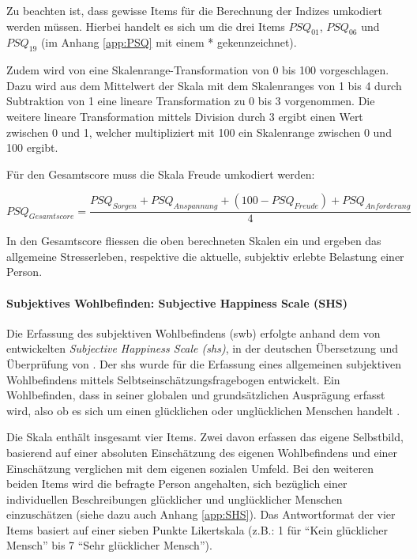 Zu beachten ist, dass gewisse Items für die Berechnung der Indizes umkodiert werden müssen. Hierbei handelt es sich um die drei Items $PSQ_{01}$, $PSQ_{06}$ und $PSQ_{19}$ (im Anhang \ref{app:PSQ} mit einem * gekennzeichnet).

Zudem wird von  eine Skalenrange-Transformation von 0 bis 100 vorgeschlagen. Dazu wird aus dem Mittelwert der Skala mit dem Skalenranges von 1 bis 4 durch Subtraktion von 1 eine lineare Transformation zu 0 bis 3 vorgenommen. Die weitere lineare Transformation mittels Division durch 3 ergibt einen Wert zwischen 0 und 1, welcher multipliziert mit 100 ein Skalenrange zwischen 0 und 100 ergibt.  

Für den Gesamtscore muss die Skala Freude umkodiert werden:

\begin{equation}\label{eq:PSQGesamtscore}
    PSQ_{Gesamtscore}=\frac{PSQ_{Sorgen}+PSQ_{Anspannung}+ (100-PSQ_{Freude})+PSQ_{Anforderung}}{4}
\end{equation}

In den Gesamtscore fliessen die oben berechneten Skalen ein und ergeben das allgemeine Stresserleben, respektive die aktuelle, subjektiv erlebte Belastung einer Person.

\paragraph{Subjektives Wohlbefinden: Subjective Happiness Scale (SHS)}\label{sec:SWB}
Die Erfassung des subjektiven Wohlbefindens (\acrshort{swb}) erfolgte anhand dem von  entwickelten \textit{Subjective Happiness Scale (\acrshort{shs})}, in der deutschen Übersetzung und Überprüfung von . Der \acrshort{shs} wurde für die Erfassung  eines allgemeinen subjektiven Wohlbefindens mittels Selbtseinschätzungsfragebogen entwickelt. Ein Wohlbefinden, dass in seiner globalen und grundsätzlichen Ausprägung erfasst wird, also ob es sich um einen glücklichen oder unglücklichen Menschen handelt  \cite[S.~139ff]{Lyubomirsky1999}.

Die Skala enthält insgesamt vier Items. Zwei davon erfassen das eigene Selbstbild, basierend auf einer absoluten Einschätzung des eigenen Wohlbefindens und einer Einschätzung verglichen mit dem eigenen sozialen Umfeld. Bei den weiteren beiden Items wird die befragte Person angehalten, sich bezüglich einer individuellen Beschreibungen glücklicher und unglücklicher Menschen einzuschätzen (siehe dazu auch Anhang \ref{app:SHS}). Das Antwortformat der vier Items basiert auf einer sieben Punkte Likertskala (z.B.: 1 für \enquote{Kein glücklicher Mensch} bis 7 \enquote{Sehr glücklicher Mensch}). 

